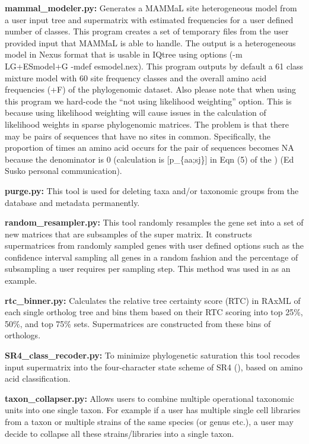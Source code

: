 \documentclass{article}
\begin{document}
\begin{description}
    \item \textbf{mammal\_modeler.py:} Generates a MAMMaL site heterogeneous model from a user input tree and supermatrix with estimated frequencies for a user defined number of classes. This program creates a set of temporary files from the user provided input that MAMMaL is able to handle. The output is a heterogeneous model in Nexus format that is usable in IQtree using options (-m LG+ESmodel+G -mdef esmodel.nex). This program outputs by default a 61 class mixture model with 60 site frequency classes and the overall amino acid frequencies (+F) of the phylogenomic dataset. Also please note that when using this program we hard-code the “not using likelihood weighting” option. This is because using likelihood weighting will cause issues in the calculation of likelihood weights in sparse phylogenomic matrices. The problem is that there may be pairs of sequences that have no sites in common. Specifically, the proportion of times an amino acid occurs for the pair of sequences becomes NA because the denominator is 0 (calculation is [p\_\{aa;sj\}] in Eqn (5) of the \cite{susko_accelerated_2018}) (Ed Susko personal communication). 

    \item \textbf{purge.py:} This tool is used for deleting taxa and/or taxonomic groups from the database and metadata permanently. 

    \item \textbf{random\_resampler.py:} This tool randomly resamples the gene set into a set of new matrices that are subsamples of the super matrix. It constructs supermatrices from randomly sampled genes with user defined options such as the confidence interval sampling all genes in a random fashion and the percentage of subsampling a user requires per sampling step. This method was used in \cite{brown_phylogenomics_2018} as an example. 

    \item \textbf{rtc\_binner.py:} Calculates the relative tree certainty score (RTC) in RAxML \cite{stamatakis_raxml_2014} of each single ortholog tree and bins them based on their RTC scoring into top 25\%, 50\%, and top 75\% sets. Supermatrices are constructed from these bins of orthologs. 

    \item \textbf{SR4\_class\_recoder.py:} To minimize phylogenetic saturation this tool recodes input supermatrix into the four-character state scheme of SR4 (\cite{Susko-SR4}), based on  amino acid classification.

    \item \textbf{taxon\_collapser.py:} Allows users to combine multiple operational taxonomic units into one single taxon. For example if a user has multiple single cell libraries from a taxon or multiple strains of the same species (or genus etc.), a user may decide to  collapse all these strains/libraries into a single taxon. 
    \end{description}
    
\end{document}
